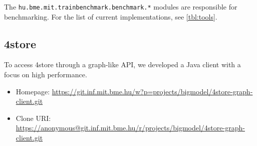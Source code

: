 The \texttt{hu.bme.mit.trainbenchmark.benchmark.*} modules are responsible for benchmarking. For the list of current implementations, see \autoref{tbl:tools}.

\subsection{4store}

To access 4store through a graph-like API, we developed a Java client with a focus on high performance.

\begin{itemize}
  \item Homepage: \url{https://git.inf.mit.bme.hu/w?p=projects/bigmodel/4store-graph-client.git}
  \item Clone URI: \url{https://anonymous@git.inf.mit.bme.hu/r/projects/bigmodel/4store-graph-client.git}
\end{itemize}

